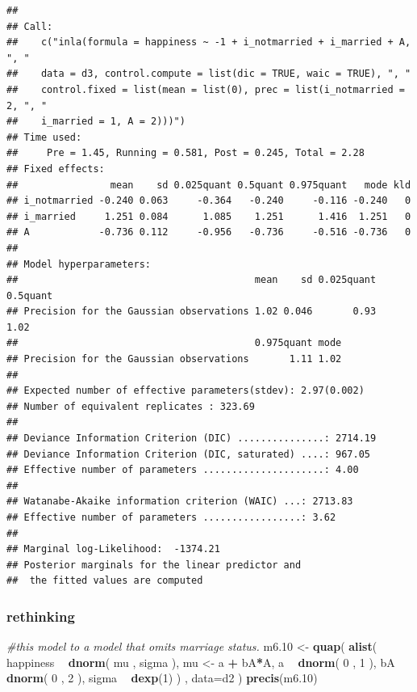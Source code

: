 \documentclass[
]{article}
\newenvironment{Shaded}{\begin{snugshade}}{\end{snugshade}}
\newcommand{\CommentTok}[1]{\textcolor[rgb]{0.56,0.35,0.01}{\textit{#1}}}
\newcommand{\DataTypeTok}[1]{\textcolor[rgb]{0.13,0.29,0.53}{#1}}
\newcommand{\DecValTok}[1]{\textcolor[rgb]{0.00,0.00,0.81}{#1}}
\newcommand{\FloatTok}[1]{\textcolor[rgb]{0.00,0.00,0.81}{#1}}
\newcommand{\KeywordTok}[1]{\textcolor[rgb]{0.13,0.29,0.53}{\textbf{#1}}}
\newcommand{\NormalTok}[1]{#1}
\newcommand{\OperatorTok}[1]{\textcolor[rgb]{0.81,0.36,0.00}{\textbf{#1}}}
\newcommand{\StringTok}[1]{\textcolor[rgb]{0.31,0.60,0.02}{#1}}
\begin{document}
\begin{verbatim}
## 
## Call:
##    c("inla(formula = happiness ~ -1 + i_notmarried + i_married + A, ", " 
##    data = d3, control.compute = list(dic = TRUE, waic = TRUE), ", " 
##    control.fixed = list(mean = list(0), prec = list(i_notmarried = 2, ", " 
##    i_married = 1, A = 2)))") 
## Time used:
##     Pre = 1.45, Running = 0.581, Post = 0.245, Total = 2.28 
## Fixed effects:
##                mean    sd 0.025quant 0.5quant 0.975quant   mode kld
## i_notmarried -0.240 0.063     -0.364   -0.240     -0.116 -0.240   0
## i_married     1.251 0.084      1.085    1.251      1.416  1.251   0
## A            -0.736 0.112     -0.956   -0.736     -0.516 -0.736   0
## 
## Model hyperparameters:
##                                         mean    sd 0.025quant 0.5quant
## Precision for the Gaussian observations 1.02 0.046       0.93     1.02
##                                         0.975quant mode
## Precision for the Gaussian observations       1.11 1.02
## 
## Expected number of effective parameters(stdev): 2.97(0.002)
## Number of equivalent replicates : 323.69 
## 
## Deviance Information Criterion (DIC) ...............: 2714.19
## Deviance Information Criterion (DIC, saturated) ....: 967.05
## Effective number of parameters .....................: 4.00
## 
## Watanabe-Akaike information criterion (WAIC) ...: 2713.83
## Effective number of parameters .................: 3.62
## 
## Marginal log-Likelihood:  -1374.21 
## Posterior marginals for the linear predictor and
##  the fitted values are computed
\end{verbatim}

\hypertarget{rethinking-1}{%
\subsubsection{rethinking}\label{rethinking-1}}

\begin{Shaded}
\begin{Highlighting}[]
\CommentTok{#this model to a model that omits marriage status.}
\NormalTok{m6}\FloatTok{.10}\NormalTok{ <-}\StringTok{ }\KeywordTok{quap}\NormalTok{(}
    \KeywordTok{alist}\NormalTok{(}
\NormalTok{        happiness }\OperatorTok{~}\StringTok{ }\KeywordTok{dnorm}\NormalTok{( mu , sigma ),}
\NormalTok{        mu <-}\StringTok{ }\NormalTok{a }\OperatorTok{+}\StringTok{ }\NormalTok{bA}\OperatorTok{*}\NormalTok{A,}
\NormalTok{        a }\OperatorTok{~}\StringTok{ }\KeywordTok{dnorm}\NormalTok{( }\DecValTok{0}\NormalTok{ , }\DecValTok{1}\NormalTok{ ),}
\NormalTok{        bA }\OperatorTok{~}\StringTok{ }\KeywordTok{dnorm}\NormalTok{( }\DecValTok{0}\NormalTok{ , }\DecValTok{2}\NormalTok{ ),}
\NormalTok{        sigma }\OperatorTok{~}\StringTok{ }\KeywordTok{dexp}\NormalTok{(}\DecValTok{1}\NormalTok{)}
\NormalTok{    ) , }\DataTypeTok{data=}\NormalTok{d2 )}
\KeywordTok{precis}\NormalTok{(m6}\FloatTok{.10}\NormalTok{)}
\end{Highlighting}
\end{Shaded}
\end{document}
